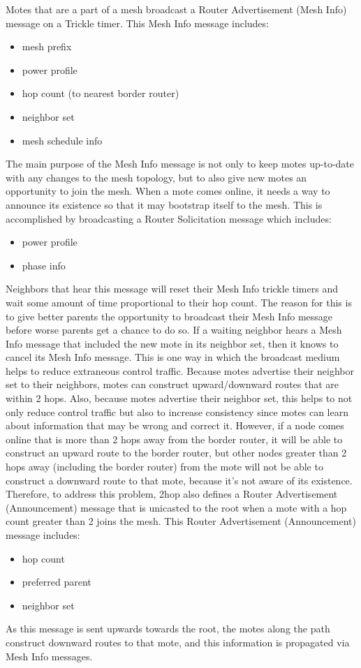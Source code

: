 Motes that are a part of a mesh broadcast a Router Advertisement (Mesh Info) message on a Trickle timer. 
This Mesh Info message includes:
\begin{itemize}
\item mesh prefix
\item power profile
\item hop count (to nearest border router)
\item neighbor set
\item mesh schedule info
\end{itemize}
The main purpose of the Mesh Info message is not only to keep motes up-to-date with any changes to the mesh topology, but to also give new motes an opportunity to join the mesh.
When a mote comes online, it needs a way to announce its existence so that it may bootstrap itself to the mesh. 
This is accomplished by broadcasting a Router Solicitation message which includes: 
\begin{itemize}
\item power profile
\item phase info
\end{itemize}
Neighbors that hear this message will reset their Mesh Info trickle timers and wait some amount of time proportional to their hop count. 
The reason for this is to give better parents the opportunity to broadcast their Mesh Info message before worse parents get a chance to do so.
If a waiting neighbor hears a Mesh Info message that included the new mote in its neighbor set, then it knows to cancel its Mesh Info message.
This is one way in which the broadcast medium helps to reduce extraneous control traffic.
Because motes advertise their neighbor set to their neighbors, motes can construct upward/downward routes that are within 2 hops.
Also, because motes advertise their neighbor set, this helps to not only reduce control traffic but also to increase consistency since motes can learn about information that may be wrong and correct it.
However, if a node comes online that is more than 2 hops away from the border router, it will be able to construct an upward route to the border router, but other nodes greater than 2 hops away (including the border router) from the mote will not be able to construct a downward route to that mote, because it's not aware of its existence.
Therefore, to address this problem, 2hop also defines a Router Advertisement (Announcement) message that is unicasted to the root when a mote with a hop count greater than 2 joins the mesh.
This Router Advertisement (Announcement) message includes:
\begin{itemize}
\item hop count
\item preferred parent
\item neighbor set
\end{itemize}
As this message is sent upwards towards the root, the motes along the path construct downward routes to that mote, and this information is propagated via Mesh Info messages.


